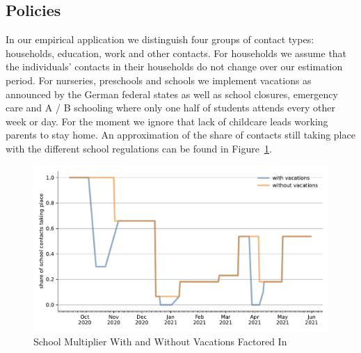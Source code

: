 \subsection{Policies}
\label{subsec:policies}

In our empirical application we distinguish four groups
of contact types: households, education, work and other contacts.%
For households we assume that the individuals'
contacts in their households do not change over our estimation period.
For nurseries, preschools and schools we implement vacations as announced by the German
federal states as well as school closures, emergency care and A / B schooling where only
one half of students attends every other week or day. For the moment we ignore that lack
of childcare leads working parents to stay home. An approximation of the share of contacts still taking place with the different school regulations can be found in Figure~\ref{fig:school_multiplier}.

\begin{figure}
    \centering
    \includegraphics[width=\textwidth]{figures/results/figures/data/school_multiplier_comparison}
    \caption{School Multiplier With and Without Vacations Factored In}
    \label{fig:school_multiplier}
\end{figure}


